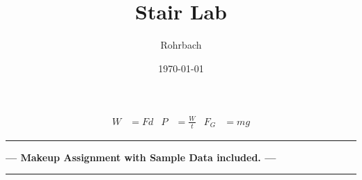 \documentclass[10pt]{exam}
\title{Stair Lab}
\author{Rohrbach}
\date{\today}
\begin{document}
\maketitle


\newcommand{\printeqs}{
  \begin{align*}
    W   &= F d          & 
    P   &= \frac{W}{t}  &
    F_G &= mg
  \end{align*}

  \vspace{-2em}
}

\vspace{-2em}
\printeqs
\vspace{-2em}

\ifprintanswers
  \vspace{3em}

  \begin{center}
    \color{red} 
    \hrule
    \Large \bf --- Makeup Assignment with Sample Data included. ---
    \hrule
  \end{center}

  \vspace{-2em}

\fi
\end{document}
